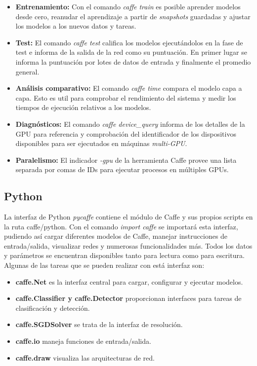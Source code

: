 \documentclass[a4paper, 12pt, oneside]{book}
\begin{document}
\begin{itemize}
\item \textbf{Entrenamiento:}  Con el comando \textit{caffe train} es posible aprender modelos desde cero, reanudar el aprendizaje a partir de \textit{snapshots} guardadas y ajustar los modelos a los nuevos datos y tareas.
\item \textbf{Test:} El comando \textit{caffe test} califica los modelos ejecutándolos en la fase de test e informa de la salida de la red como su puntuación. En primer lugar se informa la puntuación por lotes de datos de entrada y finalmente el promedio general. 
\item \textbf{Análisis comparativo:} El comando \textit{caffe time} compara el modelo capa a capa. Esto es util para comprobar el rendimiento del sistema y medir los tiempos de ejecución relativos a los modelos.
\item \textbf{Diagnósticos:} El comando \textit{caffe device\_query} informa de los detalles de la GPU para referencia y comprobación del identificador de los dispositivos disponibles para ser ejecutados en máquinas \textit{multi-GPU}.
\item \textbf{Paralelismo:} El indicador \textit{-gpu} de la herramienta Caffe provee una lista separada por comas de IDs para ejecutar procesos en múltiples GPUs.
\end{itemize}

\subsection{Python}

La interfaz de Python \textit{pycaffe} contiene el módulo de Caffe y sus propios scripts en la ruta caffe/python. Con el comando \textit{import caffe} se importará esta interfaz, pudiendo así cargar diferentes modelos de Caffe, manejar instrucciones de entrada/salida, visualizar redes y numerosas funcionalidades más. Todos los datos y parámetros se encuentran disponibles tanto para lectura como para escritura. Algunas de las tareas que se pueden realizar con está interfaz son:

\begin{itemize}
\item \textbf{caffe.Net} es la interfaz central para cargar, configurar y ejecutar modelos.
\item \textbf{caffe.Classifier y caffe.Detector} proporcionan interfaces para tareas de clasificación y detección.
\item \textbf{caffe.SGDSolver} se trata de la interfaz de resolución.
\item \textbf{caffe.io} maneja funciones de entrada/salida.
\item \textbf{caffe.draw} visualiza las arquitecturas de red.
\end{itemize}
\end{document}
